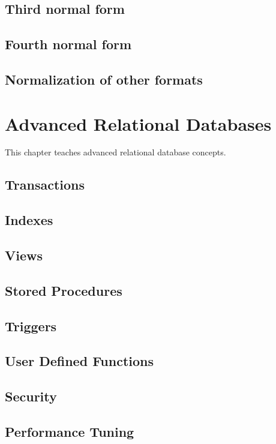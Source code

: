 \section{Third normal form}
\section{Fourth normal form}
\section{Normalization of other formats}

\chapter{Advanced Relational Databases}
\label{chap:relational:advanced-relational-databases}
This chapter teaches advanced relational database concepts.

\section{Transactions}
\section{Indexes}
\section{Views}
\section{Stored Procedures}
\section{Triggers}
\section{User Defined Functions}
\section{Security}
\section{Performance Tuning}


